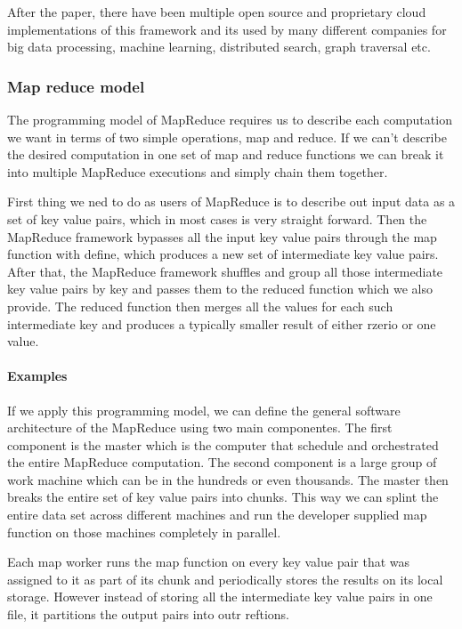 \documentclass[a4paper, 11pt]{book}
\begin{document}
    After the paper, there have been multiple open source and proprietary cloud implementations of this framework and its used by many different companies for big data processing, machine learning, distributed search, graph traversal etc.

    \subsubsection{Map reduce model}
    The programming model of MapReduce requires us to describe each computation we want in terms of two simple operations, map and reduce.
    If we can't describe the desired computation in one set of map and reduce functions we can break it into multiple MapReduce executions and simply chain them together.

    First thing we ned to do as users of MapReduce is to describe out input data as a set of key value pairs, which in most cases is very straight forward.
    Then the MapReduce framework bypasses all the input key value pairs through the map function with define, which produces a new set of intermediate key value pairs.
    After that, the MapReduce framework shuffles and group all those intermediate key value pairs by key and passes them to the reduced function which we also provide.
    The reduced function then merges all the values for each such intermediate key and produces a typically smaller result of either rzerio or one value.

    \paragraph{Examples}

    If we apply this programming model, we can define the general software architecture of the MapReduce using two main componentes.
    The first component is the master which is the computer that schedule and orchestrated the entire MapReduce computation.
    The second component is a large group of work machine which can be in the hundreds or even thousands.
    The master then breaks the entire set of key value pairs into chunks.
    This way we can splint the entire data set across different machines and run the developer supplied map function on those machines completely in parallel.

    Each map worker runs the map function on every key value pair that was assigned to it as part of its chunk and periodically stores the results on its local storage.
    However instead of storing all the intermediate key value pairs in one file, it partitions the output pairs into outr reftions.
\end{document}
